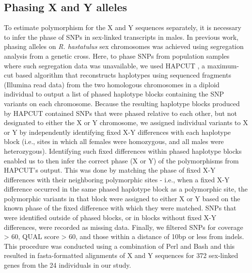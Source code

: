 \documentclass[9pt,twocolumn,twoside]{gsajnl}
\begin{document}
\subsection*{Phasing X and Y alleles} 
To estimate polymorphism for the X and Y sequences separately, it is necessary to infer the phase of SNPs in sex-linked transcripts in males. In previous work, phasing alleles on \textit{R. hastatulus} sex chromosomes was achieved using segregation analysis from a genetic cross. Here, to phase SNPs from population samples where such segregation data was unavailable, we used HAPCUT \citep{bansal2008hapcut}, a maximum-cut based algorithm that reconstructs haplotypes using sequenced fragments (Illumina read data) from the two homologous chromosomes in a diploid individual to output a list of phased haplotype blocks containing the SNP variants on each chromosome. Because the resulting haplotype blocks produced by HAPCUT contained SNPs that were phased relative to each other, but not designated to either the X or Y chromosome, we assigned individual variants to X or Y by independently identifying fixed X-Y differences with each haplotype block (i.e., sites in which all females were homozygous, and all males were heterozygous). Identifying such fixed differences within phased haplotype blocks enabled us to then infer the correct phase (X or Y) of the polymorphisms from HAPCUT’s output. This was done by matching the phase of fixed X-Y differences with their neighboring polymorphic sites - i.e., when a fixed X-Y difference occurred in the same phased haplotype block as a polymorphic site, the polymorphic variants in that block were assigned to either X or Y based on the known phase of the fixed difference with which they were matched. SNPs that were identified outside of phased blocks, or in blocks without fixed X-Y differences, were recorded as missing data. Finally, we filtered SNPs for coverage > 60, QUAL score > 60, and those within a distance of 10bp or less from indels. This procedure was conducted using a combination of Perl and Bash and this resulted in fasta-formatted alignments of X and Y sequences for 372 sex-linked genes from the 24 individuals in our study.
\end{document}
